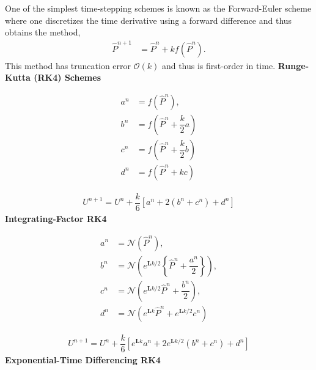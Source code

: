 \documentclass[10pt]{article}
\newcommand{\Phat}{\hat{P}}
\newcommand{\mN}{\bm{\mathcal{N}}}
\begin{document}
One of the simplest time-stepping schemes is known as the Forward-Euler scheme where one discretizes the time derivative using a forward difference and thus obtains the method, 
\begin{align}
    \Phat^{n+1} &= \Phat^{n} + kf(\Phat^{n}).\label{eq:fwd_euler}
\end{align}
This method has truncation error $\mathcal{O}(k)$ and thus is first-order in time.
\newline\newline
\textbf{Runge-Kutta (RK4) Schemes}

\begin{subequations}
    \begin{align}
        a^{n} &= f\left(\Phat^{n}\right),\\
        b^{n} &= f\left(\Phat^{n}+\dfrac{k}{2}a\right)\\
        c^{n} &= f\left(\Phat^{n}+\dfrac{k}{2}b\right)\\
        d^{n} &= f\left(\Phat^{n}+kc\right)
    \end{align}
\end{subequations}

\begin{align}
    U^{n+1} = U^{n} + \dfrac{k}{6}\left[a^{n} + 2\left(b^{n}+c^{n}\right) + d^{n}\right]\label{eq:rk4_scheme}
\end{align}
\newline\newline
\textbf{Integrating-Factor RK4}

\begin{subequations}
    \begin{align}
        a^{n} &= \mN\left(\Phat^{n}\right),\\
        b^{n} &= \mN\left(e^{\mathbf{L}k/2}\left\{\Phat^{n}+\dfrac{a^{n}}{2}\right\}\right),\\
        c^{n} &= \mN\left(e^{\mathbf{L}k/2}\Phat^{n} + \dfrac{b^{n}}{2}\right),\\
        d^{n} &= \mN\left(e^{\mathbf{L}k}\Phat^{n} + e^{\mathbf{L}k/2}c^{n}\right)
    \end{align}
\end{subequations}

\begin{align}
    U^{n+1} = U^{n} + \dfrac{k}{6}\left[e^{\mathbf{L}k}a^{n} + 2e^{\mathbf{L}k/2}\left(b^{n}+c^{n}\right) + d^{n}\right]\label{eq:if_scheme}
\end{align}
\newline\newline
\textbf{Exponential-Time Differencing RK4}
\end{document}
